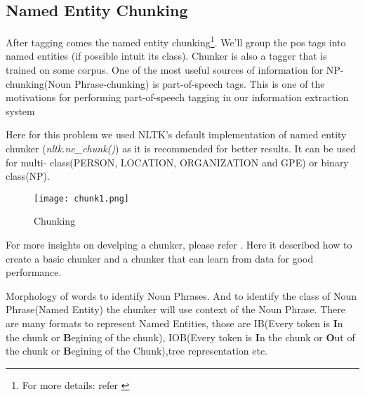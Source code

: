 \documentclass[12pt]{report}
\begin{document}
\subsection{Named Entity Chunking}
\par After tagging comes the named entity chunking\footnote{For more details: refer \cite{BookIE}}. We'll group the pos tags into named
 entities (if possible intuit its class). Chunker is also a tagger that is trained on some
  corpus.
One of the most useful sources of information for NP-chunking(Noun Phrase-chunking) is part-of-speech tags.
This is one of the motivations for performing part-of-speech tagging in our information extraction system
\par Here for this problem we used NLTK's default implementation of named entity chunker
(\textit{nltk.ne\_chunk()}) as it is recommended for better results. It can be used for multi-
class(PERSON, LOCATION, ORGANIZATION and GPE) or binary class(NP).

\begin{figure}[htp]
\centering
\texttt{[image: chunk1.png]}
\caption{Chunking}
\label{Chunk}
\end{figure}

\par For more insights on develping a chunker, please refer \cite{BookIE}. Here it described
 how to create a basic chunker and a chunker that can learn from data for good performance.
\par Morphology of words to identify Noun Phrases. And to identify the class of Noun Phrase(Named Entity) the chunker will use context of the Noun Phrase.
There are many formats to represent Named Entities, those are IB(Every token is \textbf{I}n the chunk or \textbf{B}egining of the chunk), IOB(Every token is \textbf{I}n the chunk or \textbf{O}ut of the chunk or \textbf{B}egining of the Chunk),tree representation etc.
\end{document}
